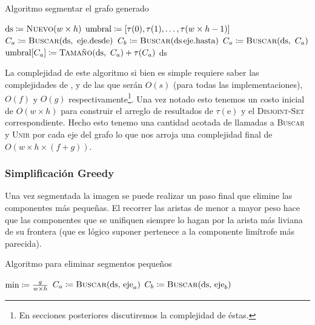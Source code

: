 \begin{algorithm}[H]
\caption{Algoritmo segmentar el grafo generado}
\begin{algorithmic}[1]
\Statex{}
	\State{} $\text{ds} \is \Call{Nuevo}{w \times h}$
	\State{} $\text{umbral} \coloneqq [\tau(0), \tau(1), \dots, \tau(w \times h - 1)]$
		\State{} $C_a \is \Call{Buscar}{\text{ds},\ \text{eje}.\text{desde}}$
		\State{} $C_b \is \Call{Buscar}{\text{ds}\, \text{eje}.\text{hasta}}$
			\State{} 
			\State{} $C_a \is \Call{Buscar}{\text{ds},\ C_a}$
			\State{} $\text{umbral}[C_a] \is \Call{Tamaño}{\text{ds},\ C_a}
				+ \tau(C_a)$
		\EndIf{}
	\EndFor{}
	\State{} \Return{} ds
\EndFunction{}
\end{algorithmic}
\end{algorithm}

La complejidad de este algoritmo si bien es simple requiere saber las
complejidades de ,  y de  las que serán $O(s)$ (para todas las implementaciones), $O(f)$ y
$O(g)$ respectivamente\footnote{En secciones posteriores discutiremos la
complejidad de éstas.}. Una vez notado esto tenemos un costo inicial de $O(w
\times h)$ para construir el arreglo de resultados de $\tau(\text{e})$ y el
\textsc{Disjoint-Set} correspondiente. Hecho esto tenemo una cantidad acotada
de llamadas a \textsc{Buscar} y \textsc{Unir} por cada eje del grafo lo que nos
arroja una complejidad final de $O(w \times h \times (f + g))$.

\subsubsection{Simplificación Greedy}

Una vez segmentada la imagen se puede realizar un paso final que elimine las
componentes más pequeñas. El recorrer las aristas de menor a mayor peso hace
que las componentes que se unifiquen siempre lo hagan por la arista más liviana
de su frontera (que es lógico suponer pertenece a la componente limítrofe más
parecida).

\begin{algorithm}[H]
\caption{Algoritmo para eliminar segmentos pequeños}
\begin{algorithmic}[1]
\Statex{}
	\State{} $\text{min} \coloneqq \frac{g}{w \times h}$
			\State{} $C_a \is \Call{Buscar}{\text{ds, eje}_a}$
			\State{} $C_b \is \Call{Buscar}{\text{ds, eje}_b}$
				\State{} 
			\EndIf{}
		\EndIf{}
	\EndFor{}
\EndFunction{}
\end{algorithmic}
\end{algorithm}

